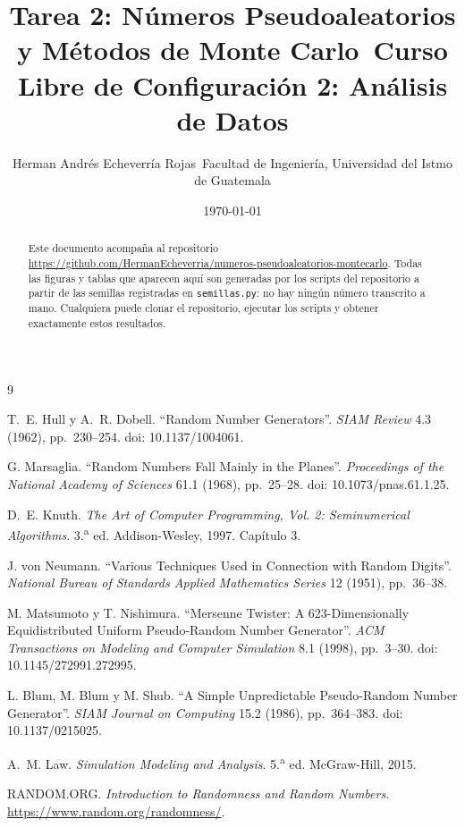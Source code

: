 \documentclass[11pt]{article}
\title{Tarea 2: Números Pseudoaleatorios y Métodos de Monte Carlo\
       \large Curso Libre de Configuración 2: Análisis de Datos}
\author{Herman Andrés Echeverría Rojas\
        \small Facultad de Ingeniería, Universidad del Istmo de Guatemala}
\date{\today}
\begin{document}
\maketitle

\begin{abstract}
\noindent
Este documento acompaña al repositorio
\url{https://github.com/HermanEcheverria/numeros-pseudoaleatorios-montecarlo}.
Todas las figuras y tablas que aparecen aquí son generadas por los scripts del
repositorio a partir de las semillas registradas en \texttt{semillas.py}: no hay
ningún número transcrito a mano. Cualquiera puede clonar el repositorio,
ejecutar los scripts y obtener exactamente estos resultados.
\end{abstract}

\tableofcontents
\newpage







\begin{thebibliography}{9}

  T.~E. Hull y A.~R. Dobell. ``Random Number Generators''.
  \emph{SIAM Review} 4.3 (1962), pp.~230--254.
  doi: 10.1137/1004061.

  G. Marsaglia. ``Random Numbers Fall Mainly in the Planes''.
  \emph{Proceedings of the National Academy of Sciences} 61.1 (1968),
  pp.~25--28. doi: 10.1073/pnas.61.1.25.

  D.~E. Knuth. \emph{The Art of Computer Programming, Vol. 2:
  Seminumerical Algorithms}. 3.\textsuperscript{a} ed. Addison-Wesley, 1997.
  Capítulo 3.

  J. von Neumann. ``Various Techniques Used in Connection with Random Digits''.
  \emph{National Bureau of Standards Applied Mathematics Series} 12 (1951),
  pp.~36--38.

  M. Matsumoto y T. Nishimura. ``Mersenne Twister: A 623-Dimensionally
  Equidistributed Uniform Pseudo-Random Number Generator''.
  \emph{ACM Transactions on Modeling and Computer Simulation} 8.1 (1998),
  pp.~3--30. doi: 10.1145/272991.272995.

  L. Blum, M. Blum y M. Shub. ``A Simple Unpredictable Pseudo-Random Number
  Generator''. \emph{SIAM Journal on Computing} 15.2 (1986), pp.~364--383.
  doi: 10.1137/0215025.

  A.~M. Law. \emph{Simulation Modeling and Analysis}. 5.\textsuperscript{a} ed.
  McGraw-Hill, 2015.

  RANDOM.ORG. \emph{Introduction to Randomness and Random Numbers}.
  \url{https://www.random.org/randomness/}.

\end{thebibliography}
\end{document}
